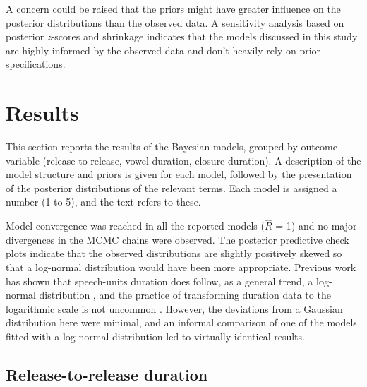\documentclass[
  12pt,
  a4paper,
  authoryear, 5p]{elsarticle}
\begin{document}
A concern could be raised that the priors might have greater influence
on the posterior distributions than the observed data. A sensitivity
analysis based on posterior \emph{z}-scores and shrinkage
\citep{betancourt2018} indicates that the models discussed in this study
are highly informed by the observed data and don't heavily rely on prior
specifications.

\hypertarget{results}{%
\section{Results}\label{results}}

This section reports the results of the Bayesian models, grouped by
outcome variable (release-to-release, vowel duration, closure duration).
A description of the model structure and priors is given for each model,
followed by the presentation of the posterior distributions of the
relevant terms. Each model is assigned a number (1 to 5), and the text
refers to these.

Model convergence was reached in all the reported models (\(\hat{R}\) =
1) and no major divergences in the MCMC chains were observed. The
posterior predictive check plots indicate that the observed
distributions are slightly positively skewed so that a log-normal
distribution would have been more appropriate. Previous work has shown
that speech-units duration does follow, as a general trend, a log-normal
distribution \citep{rosen2005, ratnikova2017}, and the practice of
transforming duration data to the logarithmic scale is not uncommon
\citep{gahl2019}. However, the deviations from a Gaussian distribution
here were minimal, and an informal comparison of one of the models
fitted with a log-normal distribution led to virtually identical
results.

\hypertarget{release-to-release-duration}{%
\subsection{Release-to-release
duration}\label{release-to-release-duration}}

\label{s:rr}
\end{document}
